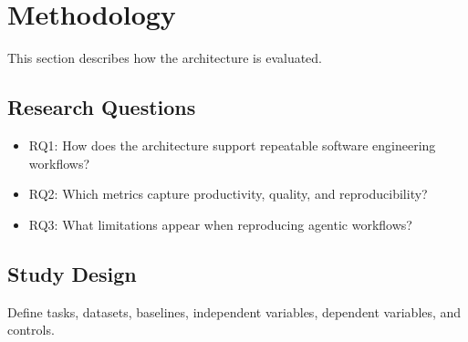 \section{Methodology}

This section describes how the architecture is evaluated.

\subsection{Research Questions}

\begin{itemize}
  \item RQ1: How does the architecture support repeatable software engineering
  workflows?
  \item RQ2: Which metrics capture productivity, quality, and reproducibility?
  \item RQ3: What limitations appear when reproducing agentic workflows?
\end{itemize}

\subsection{Study Design}

Define tasks, datasets, baselines, independent variables, dependent variables,
and controls.
